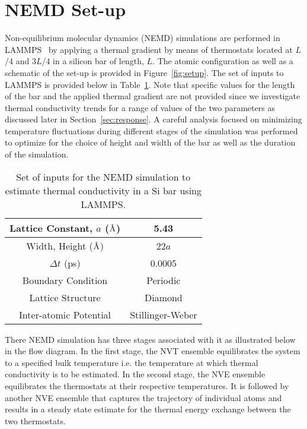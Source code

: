 \section{NEMD Set-up}
\label{sec:setup}

Non-equilibrium molecular dynamics (NEMD) simulations are performed in LAMMPS~\cite{Plimpton:2007}
by applying a thermal gradient by means of thermostats located at $L$/4 and $3L$/4 in a silicon bar of length, $L$. 
The atomic configuration as well as a schematic of the set-up is provided in Figure~\ref{fig:setup}. The set of
inputs to LAMMPS is provided below in Table~\ref{tab:input}. Note that specific values for the length of the bar
and the applied thermal gradient are not provided since we investigate thermal conductivity trends for a range of 
values of the two parameters as discussed later in Section~\ref{sec:response}. A careful analysis focused on
minimizing temperature fluctuations during different stages of the simulation was performed to optimize for the
choice of height and width of the bar as well as the duration of the simulation. 

\begin{table}[htbp]
\begin{center}
\begin{tabular}{|c||c|}
\hline
Lattice Constant, $a$ ($\mbox{\normalfont\AA}$) & 5.43 \\ \hline
Width, Height ($\mbox{\normalfont\AA}$) & 22$a$ \\ \hline
$\Delta t$  (ps) & 0.0005 \\ \hline
Boundary Condition & Periodic \\ \hline
Lattice Structure & Diamond \\ \hline
Inter-atomic Potential & Stillinger-Weber \\ 
\hline
\end{tabular}
\end{center}
\label{tab:input}
\caption{Set of inputs for the NEMD simulation to estimate thermal conductivity in a Si bar using LAMMPS.}
\end{table}

There NEMD simulation has three stages associated with it as illustrated below in the flow diagram. In the
first stage, the NVT ensemble equilibrates the system to a specified bulk temperature i.e. the temperature
at which thermal conductivity is to be estimated. In the second stage, the NVE ensemble equilibrates the
thermostats at their respective temperatures. It is followed by another NVE ensemble that captures the
trajectory of individual atoms and results in a steady state estimate for the thermal energy exchange between
the two thermostats. 

